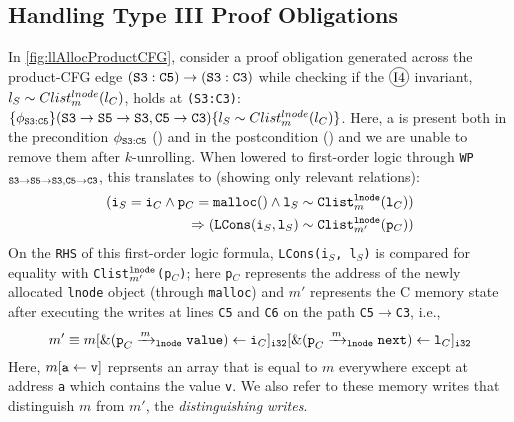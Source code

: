 \subsection{Handling Type III Proof Obligations}
\label{sec:syn-cat3}
In \cref{fig:llAllocProductCFG}, consider a proof obligation generated
across the product-CFG edge ${\tt (S3:C5) \rightarrow (S3:C3)}$
while checking if the {\small $\circled{I4}$} invariant, $l_{S}\sim{}Clist^{lnode}_{m}(l_{C})$,
holds at {\tt (S3:C3)}:
$\{\phi_{{\tt S3:C5}}\} ({\tt S3\rightarrow S5\rightarrow S3}, {\tt C5\rightarrow C3}) \{l_{S}\sim{}Clist^{lnode}_{m}(l_{C})\}$.
Here, a \recursiveRelation{} is present both in the precondition $\phi_{{\tt S3:C5}}$ ({\small {}})
and in the postcondition ({\small {}}) and we are unable to
remove them after $k$-unrolling.
When lowered to first-order logic
through {\tt WP$_{{\tt S3\rightarrow S5\rightarrow S3},{\tt C5\rightarrow C3}}$}, this translates to (showing only relevant
relations):
\begin{equation}
\begin{split}
\label{eqn:ex1cat3}
({\tt i}_S={\tt i}_C \land {\tt p}_C={\tt malloc()} \land {\tt l}_S \sim{} {\tt Clist}_m^{{\tt lnode}}({\tt l}_C)) \\ \Rightarrow ({\tt LCons}({\tt i}_S, {\tt l}_S) \sim{} {\tt Clist}_{m'}^{{\tt lnode}}({\tt p}_C))
\end{split}
\end{equation}
On the {\tt RHS} of this first-order logic formula, {\tt LCons(i$_S$, l$_S$)} is compared for
equality with {\tt Clist$_{m'}^{{\tt lnode}}$(p$_C$)}; here {\tt p$_C$}
represents the address of the newly allocated {\tt lnode} object (through {\tt malloc}) and $m'$
represents the C memory state after executing the writes at lines
{\tt C5} and {\tt C6} on the path {\tt C5$\rightarrow$C3},
i.e.,
\begin{equation}
\label{eqn:memstore}
m' \equiv m[{\tt \&(p}_C\xrightarrow[]{m}_{\mathrm{\tt lnode}}{\tt value}) \leftarrow {\tt i}_C]_{\tt i32}[{\tt \&(p}_C\xrightarrow[]{m}_{\mathrm{\tt lnode}}{\tt next}) \leftarrow {\tt l}_C]_{\tt i32}
\end{equation}
Here, $m[{\tt a}\leftarrow{\tt v}]$ reprsents an array that is
equal to $m$ everywhere except at address {\tt a} which contains the value {\tt v}.
We also refer to
these memory writes that distinguish $m$ from $m'$, the {\em distinguishing writes}.

